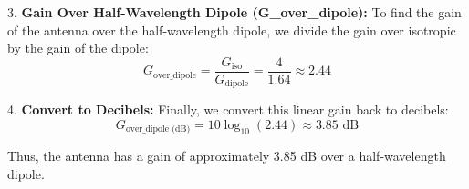3. \textbf{Gain Over Half-Wavelength Dipole (G\_over\_dipole):} To find the gain of the antenna over the half-wavelength dipole, we divide the gain over isotropic by the gain of the dipole:
   \[
   G_{\text{over\_dipole}} = \frac{G_{\text{iso}}}{G_{\text{dipole}}} = \frac{4}{1.64} \approx 2.44
   \]

4. \textbf{Convert to Decibels:} Finally, we convert this linear gain back to decibels:
   \[
   G_{\text{over\_dipole (dB)}} = 10 \log_{10}(2.44) \approx 3.85 \text{ dB}
   \]

Thus, the antenna has a gain of approximately 3.85 dB over a half-wavelength dipole.

